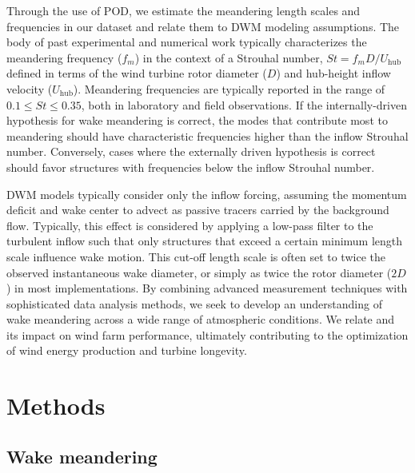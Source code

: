 \documentclass[%
 aip,
 amsmath,
 amssymb,
]{revtex4-2}
\begin{document}
Through the use of POD, we estimate the meandering length scales and frequencies in our dataset and relate them to DWM modeling assumptions. 
The body of past experimental and numerical work typically characterizes the meandering frequency ($f_m$) in the context of a Strouhal number, $St = f_m D/U_\text{hub}$ defined in terms of the wind turbine rotor diameter ($D$) and hub-height inflow velocity ($U_\text{hub}$).
Meandering frequencies are typically reported in the range of $0.1 \le St \le 0.35$, both in laboratory and field observations.\cite{coudou2018experimental, heisel2018spectral,brugger2020lidar} 
If the internally-driven hypothesis for wake meandering is correct, the modes that contribute most to meandering should have characteristic frequencies higher than the inflow Strouhal number.
Conversely, cases where the externally driven hypothesis is correct should favor structures with frequencies below the inflow Strouhal number.

DWM models \cite{larsen2008wake, jonkman2017development} typically consider only the inflow forcing, assuming the momentum deficit and wake center to advect as passive tracers carried by the background flow. 
Typically, this effect is considered by applying a low-pass filter to the turbulent inflow such that only structures that exceed a certain minimum length scale influence wake motion. 
This cut-off length scale is often set to twice the observed instantaneous wake diameter, or simply as twice the rotor diameter ($2D$) in most implementations.\cite{shaler2019fast, shaler2019effects}
By combining advanced measurement techniques with sophisticated data analysis methods, we seek to develop an understanding of wake meandering across a wide range of atmospheric conditions. 
We relate and its impact on wind farm performance, ultimately contributing to the optimization of wind energy production and turbine longevity.



\section{Methods}
\label{sec:methods}

\subsection{Wake meandering}
\label{sec:meander}
\end{document}
